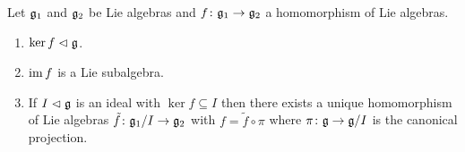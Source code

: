 \begin{prop}
 Let $\mathfrak{g}_1$ and $\mathfrak{g}_2$ be Lie algebras and $f \colon \mathfrak{g}_1 \to \mathfrak{g}_2$ a homomorphism of Lie algebras.
 \begin{enumerate}
  \item
   $\ker f \vartriangleleft \mathfrak{g}$.
  \item
   $\operatorname{im} f$ is a Lie subalgebra.
  \item
   If $I \vartriangleleft \mathfrak{g}$ is an ideal with $\ker f \subseteq I$ then there exists a unique homomorphism of Lie algebras $\tilde{f} \colon \mathfrak{g}_1/I \to \mathfrak{g}_2$ with $f = \tilde{f} \circ \pi$ where $\pi \colon \mathfrak{g} \to \mathfrak{g}/I$ is the canonical projection.
   \begin{center}
   \end{center}
 \end{enumerate}
\end{prop}











































